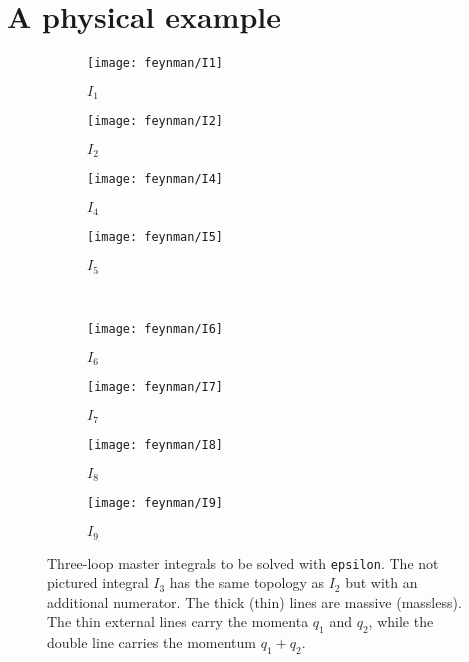 \documentclass[12pt]{article}
\numberwithin{equation}{section}
\numberwithin{figure}{section}
\begin{document}
  \section{A physical example} \label{sect:example}
    \begin{figure}
      \centering
      \begin{subfigure}[b]{.24\textwidth}
        \centering
        \texttt{[image: feynman/I1]}
        \caption*{$I_1$}
      \end{subfigure}%
      \begin{subfigure}[b]{.24\textwidth}
        \centering
        \texttt{[image: feynman/I2]}
        \caption*{$I_2$}
      \end{subfigure}%
      \begin{subfigure}[b]{.24\textwidth}
        \centering
        \texttt{[image: feynman/I4]}
        \caption*{$I_4$}
      \end{subfigure}%
      \begin{subfigure}[b]{.24\textwidth}
        \centering
        \texttt{[image: feynman/I5]}
        \caption*{$I_5$}
      \end{subfigure} \\
      \begin{subfigure}[b]{.24\textwidth}
        \centering
        \texttt{[image: feynman/I6]}
        \caption*{$I_6$}
      \end{subfigure}%
      \begin{subfigure}[b]{.24\textwidth}
        \centering
        \texttt{[image: feynman/I7]}
        \caption*{$I_7$}
      \end{subfigure}%
      \begin{subfigure}[b]{.24\textwidth}
        \centering
        \texttt{[image: feynman/I8]}
        \caption*{$I_8$}
      \end{subfigure}%
      \begin{subfigure}[b]{.24\textwidth}
        \centering
        \texttt{[image: feynman/I9]}
        \caption*{$I_9$}
      \end{subfigure}
      \caption{ \label{fig:example}
        Three-loop master integrals to be solved with \texttt{epsilon}. 
        The not pictured integral $I_3$ has the same topology as $I_2$ but with an additional numerator.
        The thick (thin) lines are massive (massless).
        The thin external lines carry the momenta $q_1$ and $q_2$, while the double line carries the momentum $q_1+q_2$.
      }
    \end{figure}
\end{document}
